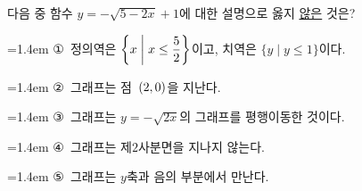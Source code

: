다음 중 함수 $y=-\sqrt{5-2x}+1$에 대한 설명으로 옳지 \underline{않은} 것은?
\par\medskip\par\noindent\hangindent=1.4em {\small ①}\ 정의역은 $\biggl\{x \biggm| x\le\dfrac{5}{2}\biggr\}$이고, 치역은 $\{y \mid y\le 1\}$이다.\par\noindent\hangindent=1.4em {\small ②}\ 그래프는 점~$(2{,}\mkern3mu\mathopen{}0)$을 지난다.\par\noindent\hangindent=1.4em {\small ③}\ 그래프는 $y=-\sqrt{2x}$의 그래프를 평행이동한 것이다.\par\noindent\hangindent=1.4em {\small ④}\ 그래프는 제$2$사분면을 지나지 않는다.\par\noindent\hangindent=1.4em {\small ⑤}\ 그래프는 $y$축과 음의 부분에서 만난다.\par\medskip
